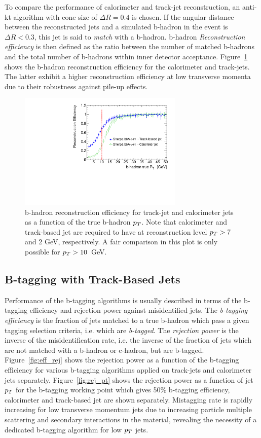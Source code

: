 To compare the performance of calorimeter and track-jet reconstruction, an anti-kt algorithm with cone size of $\Delta R = 0.4$ is chosen.
If the angular distance between the reconstructed jets and a simulated b-hadron in the event is $\Delta R  < 0.3$,
this jet is said to \emph{match} with a b-hadron. 
 b-hadron \emph{Reconstruction efficiency} is then defined as the ratio between the number of matched b-hadrons
and the total number of b-hadrons within inner detector acceptance. Figure~\ref{fig:recoEff} shows the  
b-hadron reconstruction efficiency for the calorimeter and track-jets. The latter exhibit a higher reconstruction efficiency at low 
transverse momenta due to their robustness against  pile-up effects.
\begin{figure}[tp]
\centering
\includegraphics[width=0.7\textwidth]{figure/trackjet/rec_eff2.pdf}
\caption{b-hadron reconstruction efficiency for track-jet and calorimeter jets  as a 
function of the true b-hadron $p_{T}$. Note that calorimeter  and track-based jet are required to have at 
reconstruction level $p_{T} > 7$ and 2 GeV, respectively. A fair comparison in this plot is only possible
for $p_{T} > 10$~GeV.}
\label{fig:recoEff}
\end{figure}    

\subsection{B-tagging with Track-Based Jets}
Performance of the b-tagging algorithms is usually described in terms of the b-tagging
efficiency and rejection power against misidentified jets. The \emph{b-tagging efficiency} is the fraction of jets
matched to a true b-hadron which pass a given tagging selection criteria, i.e. which are \emph{b-tagged}.
The \emph{rejection power} is the inverse of the misidentification rate, i.e. the inverse of the fraction 
of jets which are not matched with a b-hadron or c-hadron, but are b-tagged. 
Figure~\ref{fig:eff_rej} shows the rejection power as a function of the b-tagging efficiency for various b-tagging 
algorithms applied on track-jets and calorimeter jets separately. Figure~\ref{fig:rej_pt}  shows the rejection power as a function of jet $p_{T}$ for the
b-tagging working point  which gives 50\% b-tagging efficiency, calorimeter and track-based jet are shown separately. Mistagging rate is rapidly increasing
for low transverse momentum jets due to increasing particle multiple scattering and secondary interactions in the material,
revealing the necessity of a dedicated b-tagging algorithm for low $p_{T}$ jets.

